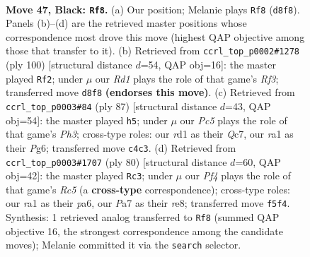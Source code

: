 \documentclass[11pt]{article}
\begin{document}
\clearpage

\begin{figure}[p]\centering
\begin{subfigure}{0.46\textwidth}\centering
\resizebox{\linewidth}{!}{%
\newchessgame
\chessboard[
  setfen={3r2k1/p7/np1P4/4Qp1q/P1p5/6P1/1P4K1/R2R4 b - - 1 47},
  showmover=false,
  pgfstyle=straightmove, color=movearrow, markmove={d8-f8}
]}
\caption{}
\end{subfigure}\hfill
\begin{subfigure}{0.46\textwidth}\centering
\resizebox{\linewidth}{!}{%
\newchessgame
\chessboard[
  setfen={5k2/5p2/2p3qp/p1r5/8/1P3R1P/P5P1/4Q1K1 w - - 32 51},
  showmover=false,
  pgfstyle=straightmove, color=movearrow, markmove={f3-f2}
]}
\caption{}
\end{subfigure}
\\[4pt]
\begin{subfigure}{0.46\textwidth}\centering
\resizebox{\linewidth}{!}{%
\newchessgame
\chessboard[
  setfen={6k1/2q2p2/6pp/3Q4/1p5P/1P3RP1/4rP1K/8 b - - 0 44},
  showmover=false,
  pgfstyle=straightmove, color=movearrow, markmove={h6-h5}
]}
\caption{}
\end{subfigure}\hfill
\begin{subfigure}{0.46\textwidth}\centering
\resizebox{\linewidth}{!}{%
\newchessgame
\chessboard[
  setfen={4rk2/3q1p2/p5r1/2R5/1P6/P3p2P/2Q3P1/4R2K w - - 7 41},
  showmover=false,
  pgfstyle=straightmove, color=movearrow, markmove={c5-c3}
]}
\caption{}
\end{subfigure}
\caption{\textbf{Move 47, Black: \texttt{Rf8}.} (a) Our position; Melanie plays \texttt{Rf8} (\texttt{d8f8}). Panels (b)--(d) are the retrieved master positions whose correspondence most drove this move (highest QAP objective among those that transfer to it). (b) Retrieved from \texttt{ccrl\_top\_p0002\#1278} (ply 100) [structural distance $d$=54, QAP obj=16]: the master played \texttt{Rf2}; under $\mu$ our \emph{Rd1} plays the role of that game's \emph{Rf3}; transferred move \texttt{d8f8} \textbf{(endorses this move)}. (c) Retrieved from \texttt{ccrl\_top\_p0003\#84} (ply 87) [structural distance $d$=43, QAP obj=54]: the master played \texttt{h5}; under $\mu$ our \emph{Pc5} plays the role of that game's \emph{Ph3}; cross-type roles: our \emph{r}d1 as their \emph{Q}c7, our \emph{r}a1 as their \emph{P}g6; transferred move \texttt{c4c3}. (d) Retrieved from \texttt{ccrl\_top\_p0003\#1707} (ply 80) [structural distance $d$=60, QAP obj=42]: the master played \texttt{Rc3}; under $\mu$ our \emph{Pf4} plays the role of that game's \emph{Rc5} (a \textbf{cross-type} correspondence); cross-type roles: our \emph{r}a1 as their \emph{p}a6, our \emph{P}a7 as their \emph{r}e8; transferred move \texttt{f5f4}. Synthesis: 1 retrieved analog transferred to \texttt{Rf8} (summed QAP objective 16, the strongest correspondence among the candidate moves); Melanie committed it via the \texttt{search} selector.}
\label{fig:thought-m93}
\end{figure}
\end{document}
